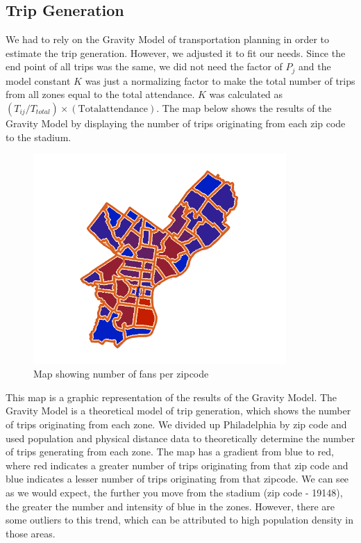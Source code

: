 
\subsection{Trip Generation}

We had to rely on the Gravity Model of transportation planning in
order to estimate the trip generation. However, we adjusted it to fit
our needs. Since the end point of all trips was the same, we did not
need the factor of $P_j$ and the model constant $K$ was just a
normalizing factor to make the total number of trips from all zones
equal to the total attendance. $K$ was calculated as
$(T_{ij}/T_{total}) \times (\mathrm{Total attendance})$. The map below
shows the results of the Gravity Model by displaying the number of
trips originating from each zip code to the stadium.

\begin{figure}[htp]
  \centering
  \includegraphics[height=8cm]{graphics/trip-generation.png}
  \caption{Map showing number of fans per zipcode}
  \label{fig-trip-generation-results}
\end{figure}

This map is a graphic representation of the results of the Gravity Model. The Gravity Model is a theoretical model of trip generation, which shows the number of trips originating from each zone. We divided up Philadelphia by zip code and used population and physical distance data to theoretically determine the number of trips generating from each zone. The map has a gradient from blue to red, where red indicates a greater number of trips originating from that zip code and blue indicates a lesser number of trips originating from that zipcode. We can see as we would expect, the further you move from the stadium (zip code - 19148), the greater the number and intensity of blue in the zones. However, there are some outliers to this trend, which can be attributed to high population density in those areas.

